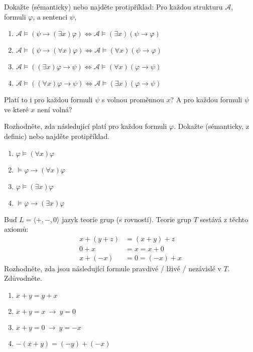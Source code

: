 \documentclass[a4paper,12pt]{article}
\begin{document}
    
\medskip\begin{problem}
    Dokažte (sémanticky) nebo najděte protipříklad: Pro každou strukturu $\mathcal{A}$, formuli $\varphi$, a sentenci $\psi$,
    \begin{enumerate}
    \item $\mathcal{A}\models (\psi \to (\exists x)\varphi) \Leftrightarrow \mathcal{A}\models (\exists x)(\psi \to \varphi)$
    \item $\mathcal{A}\models (\psi \to (\forall x)\varphi) \Leftrightarrow \mathcal{A}\models (\forall x)(\psi \to \varphi)$
    \item $\mathcal{A}\models ((\exists x)\varphi \to \psi) \Leftrightarrow \mathcal{A}\models (\forall x)(\varphi \to \psi)$
    \item $\mathcal{A}\models ((\forall x)\varphi \to \psi ) \Leftrightarrow \mathcal{A}\models (\exists x)(\varphi \to \psi)$
    \end{enumerate}
    Platí to i pro každou formuli $\psi$ s volnou proměnnou $x$? A pro každou formuli $\psi$ ve které $x$ není volná?
\end{problem}
    

\medskip\begin{problem}
    Rozhodněte, zda následující platí pro každou formuli $\varphi$. Dokažte (sémanticky, z definic) nebo najděte protipříklad.
    \begin{enumerate}
       \item $\varphi \models (\forall x)\varphi$
       \item $\models \varphi \to (\forall x)\varphi$
       \item $\varphi \models (\exists x)\varphi$
       \item $\models \varphi \to (\exists x)\varphi$
    \end{enumerate}
\end{problem}
    
    
\medskip\begin{problem}
    Buď $L=\langle +, -, 0\rangle$ jazyk teorie grup (s rovností). Teorie grup $T$ sestává z těchto axiomů:
    \begin{align*}
    x+(y+z)&=(x+y)+z\\
    0+x&=x=x+0\\
    x+(-x)&=0=(-x)+x
    \end{align*}
    Rozhodněte, zda jsou následující formule pravdivé / lživé / nezávislé v $T$. Zdůvodněte.
    \begin{enumerate}
        \item $x+y=y+x$
        \item $x+y=x\ \rightarrow\ y=0$
        \item $x+y=0\ \rightarrow\ y=-x$
        \item $-(x+y)=(-y)+(-x)$
    \end{enumerate}
\end{problem}
\end{document}
